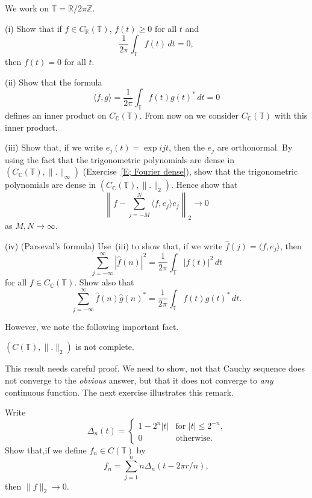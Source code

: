 \begin{exercise}\label{E;inner continuous} 
We work on ${\mathbb T}={\mathbb R}/{2\pi\mathbb Z}$.

(i) Show that if $f\in C_{\mathbb R}({\mathbb T})$, $f(t)\geq 0$
for all $t$ and 
\[\frac{1}{2\pi}\int_{\mathbb T}f(t)\,dt=0,\]
then $f(t)=0$ for all $t$.

(ii) Show that the formula
\[\langle f,g\rangle=\frac{1}{2\pi}\int_{\mathbb T}f(t)g(t)^{*}\,dt=0\]
defines an inner product on $C_{\mathbb C}({\mathbb T})$.
From now on we consider $C_{\mathbb C}({\mathbb T})$
with this inner product.

(iii) Show that, if we write $e_{j}(t)=\exp ijt$, then the $e_{j}$
are orthonormal. By using the fact that the trigonometric polynomials
are dense in $(C_{\mathbb C}({\mathbb T}),\|.\|_{\infty})$
(Exercise~\ref{E; Fourier dense}), show that
the trigonometric polynomials
are dense in $(C_{\mathbb C}({\mathbb T}),\|.\|_{2})$.
Hence show that
\[\left\|f-\sum_{j=-M}^{N}\langle f,e_{j}\rangle e_{j}\right\|_{2}
\rightarrow 0\]
as $M,N\rightarrow\infty$.

(iv) (Parseval's formula) Use~(iii) to
show that, if we write $\hat{f}(j)=\langle f,e_{j}\rangle$,
then
\[\sum_{j=-\infty}^{\infty}|\hat{f}(n)|^{2}=
\frac{1}{2\pi}\int_{\mathbb T}|f(t)|^{2}\,dt\]
for all $f\in C_{\mathbb C}({\mathbb T})$. Show also that
\[\sum_{j=-\infty}^{\infty}\hat{f}(n)\hat{g}(n)^{*}=
\frac{1}{2\pi}\int_{\mathbb T}f(t)g(t)^{*}\,dt.\]
\end{exercise}
However, we note the following important fact.
\begin{exercise}\label{E;continuous square not complete}
$(C({\mathbb T}),\|.\|_{2})$ is not complete.
\end{exercise}
This result needs careful proof. We need to show, not
that Cauchy sequence does not converge to the \emph{obvious} answer,
but that it does not converge to \emph{any} continuous function.
The next exercise illustrates this remark.
\begin{exercise} Write
\[\Delta_{n}(t)=
\begin{cases}
1-2^{n}|t|&\text{for $|t|\leq 2^{-n}$,}\\
0&\text{otherwise.}
\end{cases}\]
Show that,if we define $f_{n}\in C({\mathbb T})$ by
\[f_{n}=\sum_{j=1}^{n}n\Delta_{n}(t-2\pi r/n),\]
then $\|f\|_{2}\rightarrow 0$.
\end{exercise}
